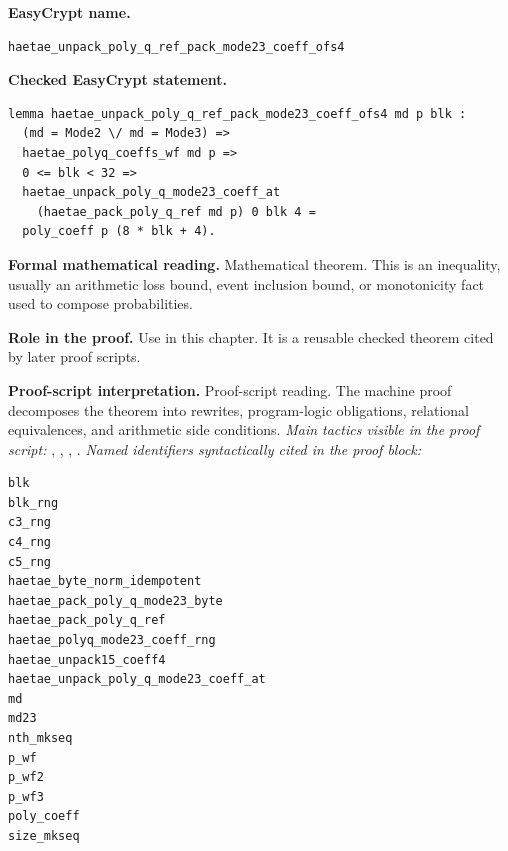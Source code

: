 \begin{formaltheorem}
\noindent\textbf{EasyCrypt name.}
\begin{lstlisting}[language=EasyCrypt,basicstyle=\ttfamily\scriptsize]
haetae_unpack_poly_q_ref_pack_mode23_coeff_ofs4
\end{lstlisting}
\noindent\textbf{Checked EasyCrypt statement.}
\begin{lstlisting}[language=EasyCrypt,basicstyle=\ttfamily\scriptsize]
lemma haetae_unpack_poly_q_ref_pack_mode23_coeff_ofs4 md p blk :
  (md = Mode2 \/ md = Mode3) =>
  haetae_polyq_coeffs_wf md p =>
  0 <= blk < 32 =>
  haetae_unpack_poly_q_mode23_coeff_at
    (haetae_pack_poly_q_ref md p) 0 blk 4 =
  poly_coeff p (8 * blk + 4).
\end{lstlisting}
\noindent\textbf{Formal mathematical reading.}
Mathematical theorem. This is an inequality, usually an arithmetic loss bound, event inclusion bound, or monotonicity fact used to compose probabilities.

\noindent\textbf{Role in the proof.}
Use in this chapter. It is a reusable checked theorem cited by later proof scripts.

\noindent\textbf{Proof-script interpretation.}
Proof-script reading. The machine proof decomposes the theorem into rewrites, program-logic obligations, relational equivalences, and arithmetic side conditions.
\emph{Main tactics visible in the proof script:} , , , .
\emph{Named identifiers syntactically cited in the proof block:}
\begin{lstlisting}[language=EasyCrypt,basicstyle=\ttfamily\scriptsize]
blk
blk_rng
c3_rng
c4_rng
c5_rng
haetae_byte_norm_idempotent
haetae_pack_poly_q_mode23_byte
haetae_pack_poly_q_ref
haetae_polyq_mode23_coeff_rng
haetae_unpack15_coeff4
haetae_unpack_poly_q_mode23_coeff_at
md
md23
nth_mkseq
p_wf
p_wf2
p_wf3
poly_coeff
size_mkseq
\end{lstlisting}

\end{formaltheorem}

